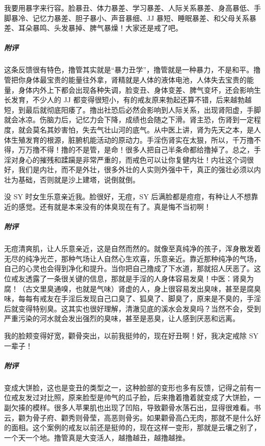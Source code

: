 \begin{case}[变丑]
    我要用暴字来行容。脸暴丑、体力暴差、学习暴差、人际关系暴差、身高暴低、手脚暴冷、记忆力暴差、胆子暴小、声音暴细、JJ 暴短、睡眠暴差、和父母关系暴差、耳朵暴鸣、头发暴掉、脾气暴燥！大家还是戒了吧。
    \subparagraph{附评} 这条反馈很有特色，撸管其实就是“暴力丑学”，撸管就是一种暴力，不是和平。撸管把你身体最宝贵的能量往外拿，肾精就是人体的液体电池，人体失去宝贵的能量，身体内外上下都会出现各种失调，脸变丑、身体变差、脾气变坏，还会影响生长发育，不少人的 JJ 都变得很短小，有的戒友原来勃起还算不错，后来越勃越短，到最后就彻底阳痿了。撸出社恐后必然会影响到人际关系，出现肾阳虚，手脚就会冰凉。伤脑力后，记忆力会下降，成绩也会随之下滑。肾主恐，伤肾到一定程度，就会莫名其妙害怕，失去气壮山河的底气。从中医上讲，肾为先天之本，是人体生殖发育的根源，脏腑机能活动的原动力。手淫伤肾实在太狠，所以，千万撸不得，万万撸不得！撸的不是管，是命！很多人把自己半条命都给撸掉了。总之，手淫对身心的摧残和蹂躏是非常严重的，而戒色可以让你复健内壮！内壮这个词很好，我们是内壮，而不是外壮，很多外壮的人实则外强中干，真正的强壮必须以内壮为基础，否则就是沙上建塔，说倒就倒。
\end{case}

\begin{case}[变丑]
    没 SY 时女生乐意亲近我。脸很好，无痘，SY 后满脸都是痘痘，有种让人不想靠近的感觉。还有就是本来没有的体臭现在有了。真是悔不当初啊！
    \subparagraph{附评} 无痘清爽肌，让人乐意亲近，这是自然而然的。就像至真纯净的孩子，浑身散发着无尽的纯净光芒，那种气场让人自然心生欢喜，乐意亲近。靠近那种纯净的气场，自己的心灵也会得到净化和提升。当你把自己撸成了下水道，那就招人厌恶了。这位戒友透露了一条很关键的信息，那就是手淫的人身体容易发臭！中医：肾臭为腐！（古文里臭通嗅，也就是气味）肾虚的人，身上很容易发出臭味，甚至是腐臭味，每每有戒友在手淫后发现自己口臭了、狐臭了、脚臭了，原来是不臭的，手淫后就变得特别臭。这其实也很好理解，清澈见底的溪水会发臭吗？当然不会，受到严重污染的河水就会发出强烈的臭味，甚至是恶臭，让人感到厌恶和远离。
\end{case}

\begin{case}[变丑]
    我的脸颊变得好宽，颧骨突出，以前我挺帅的，现在好丑啊！好，我决定戒除 SY 一辈子！
    \subparagraph{附评} 变成大饼脸，这也是变丑的类型之一，这种脸部的变形也多有反馈，记得之前有一位戒友发过对比照，原来脸型是帅气的瓜子脸，后来撸着撸着就变成了大饼脸，一副欠揍的模样。很多人苹果肌也出现了凹陷，导致颧骨水落石出，显得很难看。书云，颧为骨子府、颧秀则骨莹，高恶则骨劣。如果颧骨高凸无肉，那就不是什么好的面相。这个案例的戒友以前还是挺帅的，现在这样一变形，那就是云壤之别了，一个天一个地。撸管真是大变活人，越撸越丑，越撸越挫。
\end{case}

